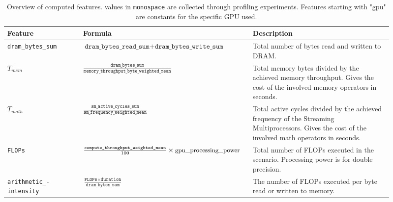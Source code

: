 \begin{table}[ht]
    \centering
    \begin{tabular}{p{0.19\linewidth}p{0.37\linewidth}p{0.35\linewidth}}
        \toprule
        Feature                                   & Formula                                                                                                 & Description                                                                                                                                       \\
        \midrule\midrule
        \texttt{dram\_bytes\_sum}                 & $\texttt{dram\_bytes\_read\_sum} + \texttt{dram\_bytes\_write\_sum}$                                    & Total number of bytes read and written to DRAM.                                                                                                   \\
        $T_{mem}$                                 & $\frac{\texttt{dram\_bytes\_sum}}{\texttt{memory\_throughput\_byte\_weighted\_mean}}$                   & Total memory bytes divided by the achieved memory throughput. Gives the cost of the involved memory operators in seconds.                         \\
        $T_{math}$                                & $\frac{\texttt{sm\_active\_cycles\_sum}}{\texttt{sm\_frequency\_weighted\_mean}}$                       & Total active cycles divided by the achieved frequency of the Streaming Multiprocessors. Gives the cost of the involved math operators in seconds. \\
        \texttt{FLOPs}                            & $\frac{\texttt{compute\_throughput\_weighted\_mean}}{100} \times \text{\small{gpu\_processing\_power}}$ & Total number of FLOPs executed in the scenario. Processing power is for double precision.                                                         \\
        \texttt{arithmetic\_-} \texttt{intensity} & $\frac{\texttt{FLOPs} \times \texttt{duration}}{\texttt{dram\_bytes\_sum}}$                             & The number of FLOPs executed per byte read or written to memory.                                                                                  \\

        \bottomrule
    \end{tabular}
    \caption[Derived features]{Overview of computed features. values in \texttt{monospace} are collected through profiling experiments. Features starting with "gpu" are constants for the specific GPU used.}
    \label{tab:5-derived-features}
\end{table}




